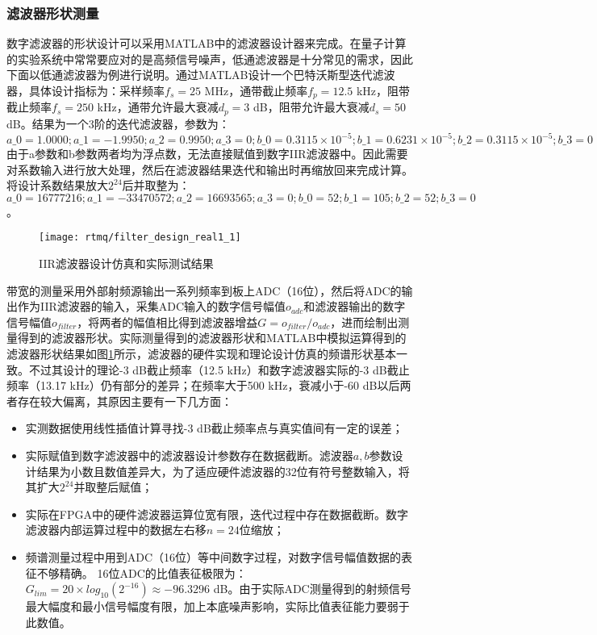 \subsubsection[滤波器形状测量]{滤波器形状测量}
数字滤波器的形状设计可以采用MATLAB中的滤波器设计器来完成。在量子计算的实验系统中常常要应对的是高频信号噪声，低通滤波器是十分常见的需求，因此下面以低通滤波器为例进行说明。通过MATLAB设计一个巴特沃斯型迭代滤波器，具体设计指标为：采样频率$f_s=25$ MHz，通带截止频率$f_p=12.5$ kHz，阻带截止频率$f_s=250$ kHz，通带允许最大衰减$d_p=3$ dB，阻带允许最大衰减$d_s=50$ dB。结果为一个3阶的迭代滤波器，参数为：
$
a\_0=1.0000;
a\_1=-1.9950;
a\_2=0.9950;
a\_3=0;
b\_0=0.3115\times 10^{-5};
b\_1=0.6231\times 10^{-5};
b\_2=0.3115\times 10^{-5};
b\_3=0$
由于a参数和b参数两者均为浮点数，无法直接赋值到数字IIR滤波器中。因此需要对系数输入进行放大处理，然后在滤波器结果迭代和输出时再缩放回来完成计算。将设计系数结果放大$2^{24}$后并取整为：
$a\_0=16777216;
a\_1=-33470572;
a\_2=16693565;
a\_3=0;
b\_0=52;
b\_1=105;
b\_2=52;
b\_3=0$。

\begin{figure}
    \centering
    \texttt{[image: rtmq/filter\_design\_real1\_1]}
    \caption[IIR滤波器设计仿真和实际测试结果]{IIR滤波器设计仿真和实际测试结果\label{fig:filter_design_real1}}
\end{figure}

带宽的测量采用外部射频源输出一系列频率到板上ADC（16位），然后将ADC的输出作为IIR滤波器的输入，采集ADC输入的数字信号幅值$o_{adc}$和滤波器输出的数字信号幅值$o_{filter}$，将两者的幅值相比得到滤波器增益$G=o_{filter}/o_{adc}$，进而绘制出测量得到的滤波器形状。实际测量得到的滤波器形状和MATLAB中模拟运算得到的滤波器形状结果如图\ref{fig:filter_design_real1}所示，滤波器的硬件实现和理论设计仿真的频谱形状基本一致。不过其设计的理论-3 dB截止频率（12.5 kHz）和数字滤波器实际的-3 dB截止频率（13.17 kHz）仍有部分的差异；在频率大于500 kHz，衰减小于-60 dB以后两者存在较大偏离，其原因主要有一下几方面：
\begin{itemize}
    \item 实测数据使用线性插值计算寻找-3 dB截止频率点与真实值间有一定的误差；
    \item 实际赋值到数字滤波器中的滤波器设计参数存在数据截断。滤波器$a,b$参数设计结果为小数且数值差异大，为了适应硬件滤波器的32位有符号整数输入，将其扩大$2^{24}$并取整后赋值；
    \item 实际在FPGA中的硬件滤波器运算位宽有限，迭代过程中存在数据截断。数字滤波器内部运算过程中的数据左右移$n=24$位缩放；
    \item 频谱测量过程中用到ADC（16位）等中间数字过程，对数字信号幅值数据的表征不够精确。
    16位ADC的比值表征极限为：$G_{lim}=20\times log_{10}(2^{-16})\approx -96.3296$ dB。由于实际ADC测量得到的射频信号最大幅度和最小信号幅度有限，加上本底噪声影响，实际比值表征能力要弱于此数值。
\end{itemize}

